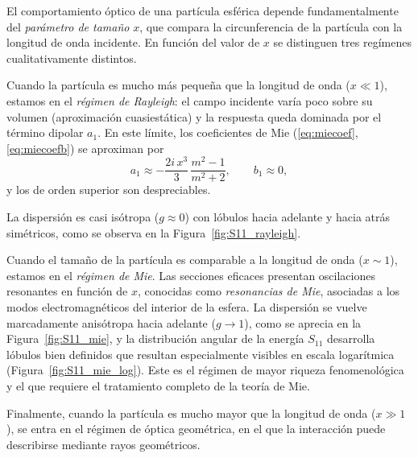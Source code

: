 El comportamiento óptico de una partícula esférica depende fundamentalmente del
\textit{parámetro de tamaño} $x$, que compara la
circunferencia de la partícula con la longitud de onda incidente. En función
del valor de $x$ se distinguen tres regímenes cualitativamente distintos.

Cuando la partícula es mucho más pequeña que la longitud de onda ($x \ll 1$),
estamos en el \textit{régimen de Rayleigh}: el campo incidente varía poco sobre
su volumen (aproximación cuasiestática) y la respuesta queda dominada por el término dipolar $a_1$. 
En este límite, los coeficientes de Mie (\ref{eq:miecoef},\ref{eq:miecoefb}) se aproximan por
\begin{equation}
  a_1 \approx -\frac{2i\,x^3}{3}\,\frac{m^2-1}{m^2+2},
  \qquad
  b_1 \approx 0,
\end{equation}
y los de orden superior son despreciables.


La dispersión es
casi isótropa ($g \approx 0$) con lóbulos hacia adelante y hacia atrás
simétricos, como se observa en la Figura~\ref{fig:S11_rayleigh}.

Cuando el tamaño de la partícula es comparable a la longitud de onda ($x \sim
1$), estamos en el \textit{régimen de Mie}. Las secciones eficaces presentan
oscilaciones resonantes en función de $x$, conocidas como \textit{resonancias
de Mie}, asociadas a los modos electromagnéticos del interior de la esfera. La
dispersión se vuelve marcadamente anisótropa hacia adelante ($g \to 1$), como
se aprecia en la Figura~\ref{fig:S11_mie}, y la distribución angular de la energía
$S_{11}$ desarrolla
lóbulos bien definidos que resultan especialmente visibles en escala
logarítmica (Figura~\ref{fig:S11_mie_log}). Este es el régimen de mayor
riqueza fenomenológica y el que requiere el tratamiento completo de la teoría
de Mie.

Finalmente, cuando la partícula es mucho mayor que la longitud de onda
($x \gg 1$), se entra en el régimen de óptica geométrica, en el que la
interacción puede describirse mediante rayos geométricos.

